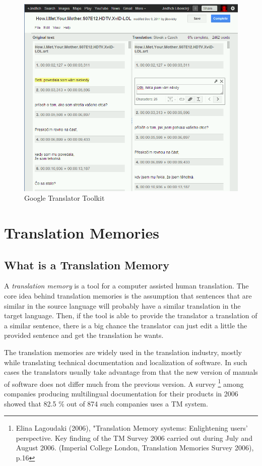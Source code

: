 \begin{figure}

\begin{center}
\includegraphics[scale=0.4]{./figures/google_translator_toolkit.png}
\end{center}

\caption{Google Translator Toolkit} \label{google_translator_toolkit}
\end{figure}

\section{Translation Memories}
\subsection{What is a Translation Memory}

A \emph{translation memory} is a tool for a computer assisted human translation. The core idea behind translation memories is the assumption that sentences that are similar in the source language will probably have a similar translation in the target language. Then, if the tool is able to provide the translator a translation of a similar sentence, there is a big chance the translator can just edit a little the provided sentence and get the translation he wants.

The translation memories are widely used in the translation industry, mostly while translating technical documentation and localization of software. In such cases the translators usually take advantage from that the new version of manuals of software does not differ much from the previous version. A survey \footnote{Elina Lagoudaki (2006), "Translation Memory systems: Enlightening users' perspective. Key finding of the TM Survey 2006 carried out during July and August 2006. (Imperial College London, Translation Memories Survey 2006), p.16} among companies producing multilingual documentation for their products in 2006 showed that 82.5 \% out of 874 such companies uses a TM system.

